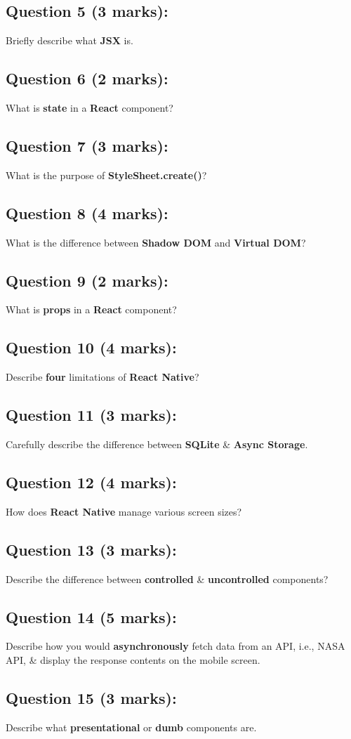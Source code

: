 \documentclass{article}
\begin{document}
\subsection*{Question 5 (3 marks):}
Briefly describe what \textbf{JSX} is.

\subsection*{Question 6 (2 marks):}
What is \textbf{state} in a \textbf{React} component?

\subsection*{Question 7 (3 marks):}
What is the purpose of \textbf{StyleSheet.create()}?

\subsection*{Question 8 (4 marks):}
What is the difference between \textbf{Shadow DOM} and \textbf{Virtual DOM}?

\subsection*{Question 9 (2 marks):}
What is \textbf{props} in a \textbf{React} component?

\subsection*{Question 10 (4 marks):}
Describe \textbf{four} limitations of \textbf{React Native}?

\subsection*{Question 11 (3 marks):}
Carefully describe the difference between \textbf{SQLite} \& \textbf{Async Storage}.

\subsection*{Question 12 (4 marks):}
How does \textbf{React Native} manage various screen sizes?

\subsection*{Question 13 (3 marks):}
Describe the difference between \textbf{controlled} \& \textbf{uncontrolled} components?

\subsection*{Question 14 (5 marks):}
Describe how you would \textbf{asynchronously} fetch data from an API, i.e., NASA API, \& display the response contents on the mobile screen.

\subsection*{Question 15 (3 marks):}
Describe what \textbf{presentational} or \textbf{dumb} components are.
\end{document}
